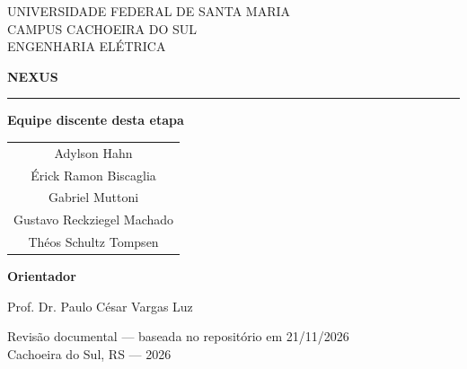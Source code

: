 \documentclass[11pt,a4paper,oneside]{report}
\begin{document}
\hypersetup{pageanchor=false}
\begin{titlepage}
\centering
{\small UNIVERSIDADE FEDERAL DE SANTA MARIA\\CAMPUS CACHOEIRA DO SUL\\ENGENHARIA ELÉTRICA\par}
\vspace{2cm}
{\color{nexus}\fontsize{48}{52}\selectfont\bfseries NEXUS\par}
\vspace{0.3cm}{\Large Manual técnico do sistema\par}
\vspace{0.4cm}{\large Instrumentação, telemetria e integração\\do veículo elétrico experimental\par}
\vspace{1cm}\textcolor{accent}{\rule{0.75\textwidth}{1.5pt}}\par
\vspace{1.0cm}
\begin{minipage}{0.83\textwidth}
\centering
\textbf{Equipe discente desta etapa}\par\vspace{0.25cm}
\begin{tabular}{c}
Adylson Hahn\\[0.12cm]
Érick Ramon Biscaglia\\[0.12cm]
Gabriel Muttoni\\[0.12cm]
Gustavo Reckziegel Machado\\[0.12cm]
Théos Schultz Tompsen
\end{tabular}\par
\vspace{0.65cm}
\textbf{Orientador}\par\vspace{0.15cm}
Prof. Dr. Paulo César Vargas Luz\par
\end{minipage}
\vfill
{\small Revisão documental \nexusRevision{} --- baseada no repositório em 21/11/2026\\Cachoeira do Sul, RS --- 2026\par}
\end{titlepage}
\hypersetup{pageanchor=true}
\end{document}
